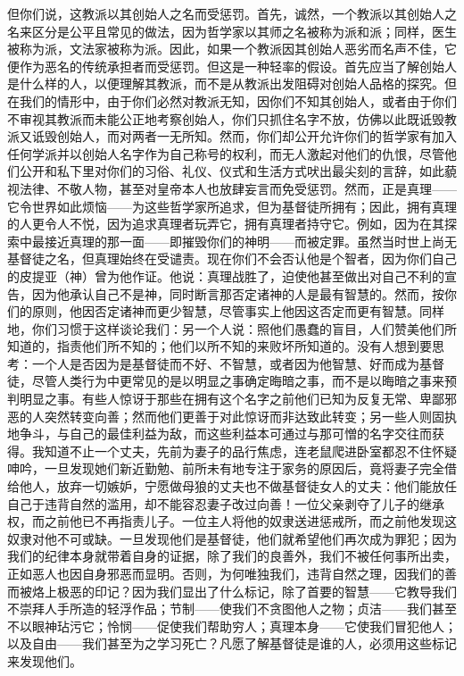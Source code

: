 但你们说，这教派以其创始人之名而受惩罚。首先，诚然，一个教派以其创始人之名来区分是公平且常见的做法，因为哲学家以其师之名被称为派和派；同样，医生被称为派，文法家被称为派。因此，如果一个教派因其创始人恶劣而名声不佳，它便作为恶名的传统承担者而受惩罚。但这是一种轻率的假设。首先应当了解创始人是什么样的人，以便理解其教派，而不是从教派出发阻碍对创始人品格的探究。但在我们的情形中，由于你们必然对教派无知，因你们不知其创始人，或者由于你们不审视其教派而未能公正地考察创始人，你们只抓住名字不放，仿佛以此既诋毁教派又诋毁创始人，而对两者一无所知。然而，你们却公开允许你们的哲学家有加入任何学派并以创始人名字作为自己称号的权利，而无人激起对他们的仇恨，尽管他们公开和私下里对你们的习俗、礼仪、仪式和生活方式吠出最尖刻的言辞，如此藐视法律、不敬人物，甚至对皇帝本人也放肆妄言而免受惩罚。然而，正是真理——它令世界如此烦恼——为这些哲学家所追求，但为基督徒所拥有；因此，拥有真理的人更令人不悦，因为追求真理者玩弄它，拥有真理者持守它。例如，因为在其探索中最接近真理的那一面——即摧毁你们的神明——而被定罪。虽然当时世上尚无基督徒之名，但真理始终在受谴责。现在你们不会否认他是个智者，因为你们自己的皮提亚（神）曾为他作证。他说：真理战胜了，迫使他甚至做出对自己不利的宣告，因为他承认自己不是神，同时断言那否定诸神的人是最有智慧的。然而，按你们的原则，他因否定诸神而更少智慧，尽管事实上他因这否定而更有智慧。同样地，你们习惯于这样谈论我们：另一个人说：照他们愚蠢的盲目，人们赞美他们所知道的，指责他们所不知的；他们以所不知的来败坏所知道的。没有人想到要思考：一个人是否因为是基督徒而不好、不智慧，或者因为他智慧、好而成为基督徒，尽管人类行为中更常见的是以明显之事确定晦暗之事，而不是以晦暗之事来预判明显之事。有些人惊讶于那些在拥有这个名字之前他们已知为反复无常、卑鄙邪恶的人突然转变向善；然而他们更善于对此惊讶而非达致此转变；另一些人则固执地争斗，与自己的最佳利益为敌，而这些利益本可通过与那可憎的名字交往而获得。我知道不止一个丈夫，先前为妻子的品行焦虑，连老鼠爬进卧室都忍不住怀疑呻吟，一旦发现她们新近勤勉、前所未有地专注于家务的原因后，竟将妻子完全借给他人，放弃一切嫉妒，宁愿做母狼的丈夫也不做基督徒女人的丈夫：他们能放任自己于违背自然的滥用，却不能容忍妻子改过向善！一位父亲剥夺了儿子的继承权，而之前他已不再指责儿子。一位主人将他的奴隶送进惩戒所，而之前他发现这奴隶对他不可或缺。一旦发现他们是基督徒，他们就希望他们再次成为罪犯；因为我们的纪律本身就带着自身的证据，除了我们的良善外，我们不被任何事所出卖，正如恶人也因自身邪恶而显明。否则，为何唯独我们，违背自然之理，因我们的善而被烙上极恶的印记？因为我们显出了什么标记，除了首要的智慧——它教导我们不崇拜人手所造的轻浮作品；节制——使我们不贪图他人之物；贞洁——我们甚至不以眼神玷污它；怜悯——促使我们帮助穷人；真理本身——它使我们冒犯他人；以及自由——我们甚至为之学习死亡？凡愿了解基督徒是谁的人，必须用这些标记来发现他们。\par

